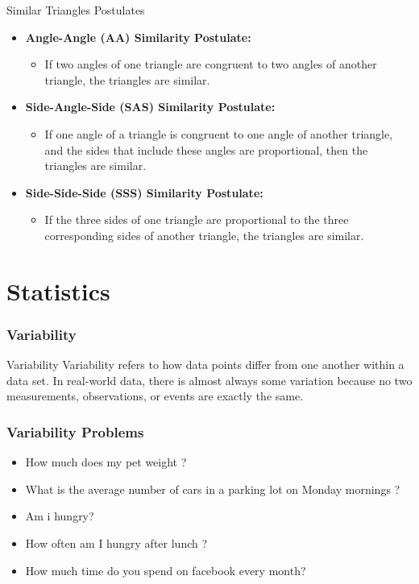 \documentclass{beamer}
\begin{document}
\begin{frame}{Similar Triangles Postulates}
    \begin{itemize}
        \item \textbf{Angle-Angle (AA) Similarity Postulate:} 
        \begin{itemize}
            \item If two angles of one triangle are congruent to two angles of another triangle, the triangles are similar.
        \end{itemize}

        \item \textbf{Side-Angle-Side (SAS) Similarity Postulate:} 
        \begin{itemize}
            \item If one angle of a triangle is congruent to one angle of another triangle, and the sides that include these angles are proportional, then the triangles are similar.
        \end{itemize}

        \item \textbf{Side-Side-Side (SSS) Similarity Postulate:} 
        \begin{itemize}
            \item If the three sides of one triangle are proportional to the three corresponding sides of another triangle, the triangles are similar.
        \end{itemize}
    \end{itemize}
    
\end{frame}



\section{Statistics}
\begin{frame}
    \frametitle{Variability}
    \begin{block}{Variability}
        Variability refers to how data points differ from one another within a data set. In real-world data, there is almost always some variation because no two measurements, observations, or events are exactly the same.
    \end{block}
\end{frame}

\begin{frame}
    \frametitle{Variability Problems}
        \begin{itemize}
            \item How much does my pet weight ?
            \item What is the average number of cars in a parking lot on Monday mornings ?
            \item Am i hungry?
            \item How often am I hungry after lunch ? 
            \item How much time do you spend on facebook every month? 
        \end{itemize}
\end{frame}
\end{document}
